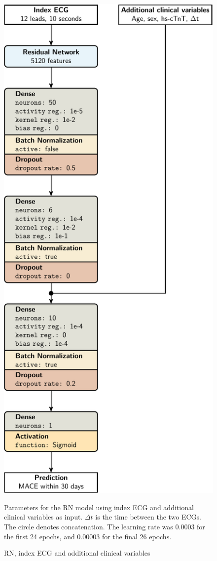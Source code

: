 \documentclass[preprint]{elsarticle}
\begin{document}
\begin{figure}[H]
\centering
\includegraphics[scale=\modelscale,keepaspectratio,trim=-16em 0 0 0]{figures/model-rn3.pdf}
\caption{RN, index ECG and additional clinical variables}
\medskip
\small
Parameters for the RN model using index ECG and additional clinical variables as input. $\Delta t$ is the time between the two ECGs. The circle denotes concatenation. The learning rate was 0.0003 for the first 24 epochs, and 0.00003 for the final 26 epochs. 
\end{figure}
\end{document}
